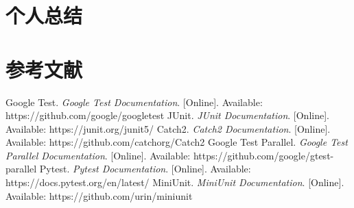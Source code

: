 \documentclass{article}
\begin{document}
\section{个人总结}

\section{参考文献}
\begin{thebibliography}{99}
     Google Test. \textit{Google Test Documentation}. [Online]. Available: https://github.com/google/googletest
     JUnit. \textit{JUnit Documentation}. [Online]. Available: https://junit.org/junit5/
     Catch2. \textit{Catch2 Documentation}. [Online]. Available: https://github.com/catchorg/Catch2
     Google Test Parallel. \textit{Google Test Parallel Documentation}. [Online]. Available: https://github.com/google/gtest-parallel
     Pytest. \textit{Pytest Documentation}. [Online]. Available: https://docs.pytest.org/en/latest/
     MiniUnit. \textit{MiniUnit Documentation}. [Online]. Available: https://github.com/urin/miniunit
\end{thebibliography}
\end{document}
